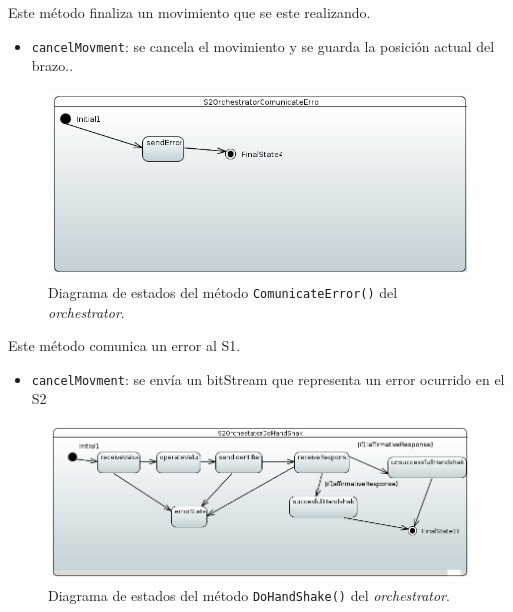 Este método finaliza un movimiento que se este realizando.

\begin{itemize}
    \item \texttt{cancelMovment}: se cancela el movimiento y se guarda la posición actual del brazo..
    
\end{itemize}

\begin{figure}[H]
    \centering
    \includegraphics[width=1\linewidth]{pictures/S2OrchestratorComunicateError.PNG}
    \caption{Diagrama de estados del método \texttt{ComunicateError()} del \textit{orchestrator}.}
    \label{fig:fun_comunicate_error_orchestrator}
\end{figure}

Este método comunica un error al \ac{S1}.

\begin{itemize}
    \item \texttt{cancelMovment}: se envía un bitStream que representa un error ocurrido en el \ac{S2}
    
\end{itemize}

\begin{figure}[H]
    \centering
    \includegraphics[width=1\linewidth]{pictures/S2OrchestratorDoHandShake.PNG}
    \caption{Diagrama de estados del método \texttt{DoHandShake()} del \textit{orchestrator}.}
    \label{fig:fun_do_hand_shake_orchestrator}
\end{figure}

